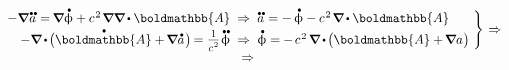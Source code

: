 \nopagebreak\vspace{-0.25em}\begin{gather*}
\left.
\begin{array}{r@{\hspace{.55em}}c@{\hspace{.55em}}l}
- \boldnabla \hspace{.1ex} \mathdotdotabove{a} \hspace{.1ex} = \hspace{-0.2ex} \boldnabla \mathdotabove{\upphi} + c^{\hspace{.16ex}2} \hspace{.22ex} \boldnabla \boldnabla \hspace{-0.1ex} \dotp \boldmathbb{A}
& \Rightarrow &
%
\mathdotdotabove{a} \hspace{.1ex} = - \hspace{.4ex} \mathdotabove{\upphi} - c^{\hspace{.16ex}2} \hspace{.22ex} \boldnabla \hspace{-0.1ex} \dotp \boldmathbb{A}
%
\\[.2em]
%
- \boldnabla \hspace{-0.12ex} \dotp \hspace{-0.2ex} \bigl( \mathdotabove{\boldmathbb{A}} + \hspace{-0.2ex} \boldnabla \mathdotabove{a} \hspace{.15ex} \bigr) \hspace{-0.2ex}
= \raisemath{.07em}{\scalebox{0.84}{$\displaystyle \frac{\raisemath{-0.16em}{1}}{\raisemath{-0.1em}c^{\hspace{.16ex}2}}$}} \hspace{.16ex} \mathdotdotabove{\upphi}
& \Rightarrow &
%
\mathdotabove{\upphi} = \hspace{-0.1ex} - \hspace{.3ex} c^{\hspace{.16ex}2} \hspace{.33ex} \boldnabla \hspace{-0.12ex} \dotp \hspace{-0.2ex} \bigl( \boldmathbb{A} + \hspace{-0.2ex} \boldnabla a \hspace{.1ex} \bigr)
\end{array}
\hspace{-0.2em} \right\rbrace \hspace{.1em} \Rightarrow
%
\\
%
\Rightarrow \hspace{.4em}

\end{gather*}
